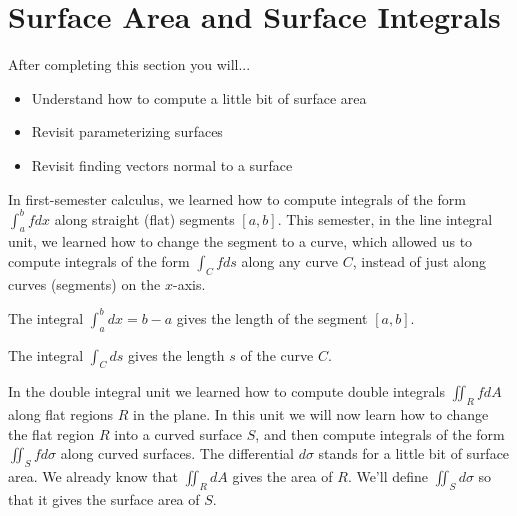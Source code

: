 \documentclass[10pt,]{book}
\theoremstyle{plain}
\theoremstyle{definition}
\theoremstyle{definition}
\theoremstyle{definition}
\theoremstyle{definition}
\theoremstyle{definition}
\numberwithin{equation}{section}
\begin{document}
\section[{Surface Area and Surface Integrals}]{Surface Area and Surface Integrals}\label{section-42}
After completing this section you will... \leavevmode%
\begin{itemize}[label=\textbullet]
\item{}Understand how to compute a little bit of surface area%
\item{}Revisit parameterizing surfaces%
\item{}Revisit finding vectors normal to a surface%
\end{itemize}
%
\par
In first-semester calculus, we learned how to compute integrals of the form \(\int_a^b f dx\) along straight (flat) segments \([a,b]\). This semester, in the line integral unit, we learned how to change the segment to a curve, which allowed us to compute integrals of the form \(\int_C fds\) along any curve \(C\), instead of just along curves (segments) on the \(x\)-axis.%
\par
The integral \(\int_a^b dx=b-a\) gives the length of the segment \([a,b]\).%
\par
The integral \(\int_C ds\) gives the length \(s\) of the curve \(C\).%
\par
In the double integral unit we learned how to compute double integrals \(\iint_R fdA\) along flat regions \(R\) in the plane. In this unit we will now learn how to change the flat region \(R\) into a curved surface \(S\), and then compute integrals of the form \(\iint_S fd\sigma\) along curved surfaces. The differential \(d\sigma\) stands for a little bit of surface area. We already know that \(\iint_R dA\) gives the area of \(R\). We'll define \(\iint_S d\sigma\) so that it gives the surface area of \(S\).%
\end{document}
